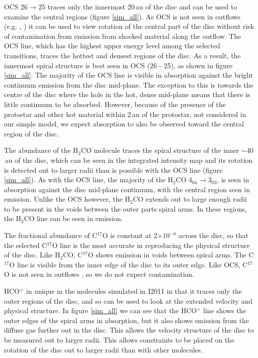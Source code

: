 \documentclass[useAMS,usenatbib]{mn2e}
\begin{document}
OCS 26$\rightarrow$25 traces only the innermost 20$\,$au of the disc and can be used to examine the central regions (figure \ref{sim_all}). As OCS is not seen in outflows (e.g. \citealt{Stanke2007}, \citealt{VDTak2003}) it can be used to view rotation of the central part of the disc without risk of contamination from emission from shocked material along the outflow. The OCS line, which has the highest upper energy level among the selected transitions, traces the hottest and densest regions of the disc. As a result, the innermost spiral structure is best seen in OCS (26 - 25), as shown in figure \ref{sim_all}. The majority of the OCS line is visible in absorption against the bright continuum emission from the disc mid-plane. The exception to this is towards the centre of the disc where the hole in the hot, dense mid-plane means that there is little continuum to be absorbed. However, because of the presence of the protostar and other hot material within 2$\,$au of the protostar, not considered in our simple model, we expect absorption to also be observed toward the central region of the disc.\smallskip

The abundance of the H$_2$CO molecule traces the spiral structure of the inner $\sim$40$\,$au of the disc, which can be seen in the integrated intensity map and its rotation is detected out to larger radii than is possible with the OCS line (figure \ref{sim_all}). As with the OCS line, the majority of the H$_2$CO 4$_{04}\rightarrow$3$_{03}$, is seen in absorption against the disc mid-plane continuum, with the central region seen in emission. Unlike the OCS however, the H$_2$CO extends out to large enough radii to be present in the voids between the outer parts spiral arms. In these regions, the H$_2$CO line can be seen in emission.\smallskip

The fractional abundance of C$^{17}$O is constant at 2$\times$10$^{-8}$ across the disc, so that the selected C$^{17}$O line is the most accurate in reproducing the physical structure of the disc. Like H$_2$CO, C$^{17}$O shows emission in voids between spiral arms. The C$^{17}$O line is visible from the inner edge of the disc to its outer edge. Like OCS, C$^{17}$O is not seen in outflows \citep{Yildiz2012}, so we do not expect contamination.\smallskip

HCO$^+$ in unique in the molecules simulated in I2011 in that it traces only the outer regions of the disc, and so can be used to look at the extended velocity and physical structure. In figure \ref{sim_all} we can see that the HCO$^+$ line shows the outer edges of the spiral arms in absorption, but it also shows emission from the diffuse gas further out in the disc. This allows the velocity structure of the disc to be measured out to larger radii. This allows constraints to be placed on the rotation of the disc out to larger radii than with other molecules. 
\end{document}
